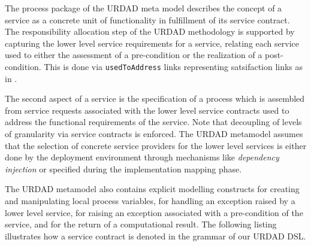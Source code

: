 The process package of the URDAD meta model describes the concept of a service as a concrete unit of functionality in fulfillment of its service contract. The responsibility allocation step of the URDAD methodology is supported by capturing the lower level service requirements for a service, relating each service used to either the assessment of a pre-condition or the realization of a post-condition. This is done via \verb+usedToAddress+ links representing satsifaction links as in  \cite{ramesh_toward_2001}. 

The second aspect of a service is the specification of a process which is assembled from service requests associated with the lower level service contracts used to address the functional requirements of the service. Note that decoupling of levels of granularity via service contracts is enforced. The URDAD metamodel assumes that the selection of concrete service providers for the lower level services is either done by the deployment environment through mechanisms like \emph{dependency injection} or specified during the implementation mapping phase.

The URDAD metamodel also contains explicit modelling constructs for creating and manipulating local process variables,  for handling an exception raised by a lower level service, for raising an exception associated with a pre-condition of the service, and for the return of a computational result. The following listing illustrates how a service contract is denoted in the grammar of our URDAD DSL.

